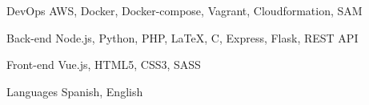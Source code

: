 

\begin{cvskills}

  \cvskill
    {DevOps} %
    {AWS, Docker, Docker-compose, Vagrant, Cloudformation, SAM} %

  \cvskill
    {Back-end} %
    {Node.js, Python, PHP, LaTeX, C, Express, Flask, REST API} %

  \cvskill
    {Front-end} %
    {Vue.js, HTML5, CSS3, SASS} %

  \cvskill
    {Languages} %
    {Spanish, English} %

\end{cvskills}
